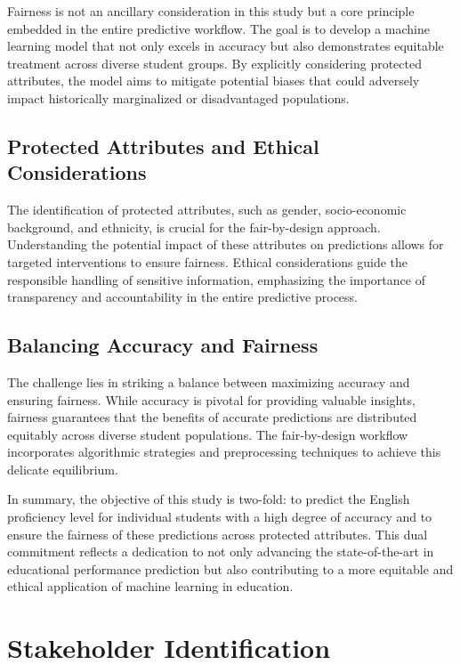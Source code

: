 \documentclass[12pt,a4paper,openright,twoside]{book}
\begin{document}
Fairness is not an ancillary consideration in this study but a core principle embedded in the entire predictive workflow. The goal is to develop a machine learning model that not only excels in accuracy but also demonstrates equitable treatment across diverse student groups. By explicitly considering protected attributes, the model aims to mitigate potential biases that could adversely impact historically marginalized or disadvantaged populations.

\subsection{Protected Attributes and Ethical Considerations}

The identification of protected attributes, such as gender, socio-economic background, and ethnicity, is crucial for the fair-by-design approach. Understanding the potential impact of these attributes on predictions allows for targeted interventions to ensure fairness. Ethical considerations guide the responsible handling of sensitive information, emphasizing the importance of transparency and accountability in the entire predictive process.

\subsection{Balancing Accuracy and Fairness}

The challenge lies in striking a balance between maximizing accuracy and ensuring fairness. While accuracy is pivotal for providing valuable insights, fairness guarantees that the benefits of accurate predictions are distributed equitably across diverse student populations. The fair-by-design workflow incorporates algorithmic strategies and preprocessing techniques to achieve this delicate equilibrium.

In summary, the objective of this study is two-fold: to predict the English proficiency level for individual students with a high degree of accuracy and to ensure the fairness of these predictions across protected attributes. This dual commitment reflects a dedication to not only advancing the state-of-the-art in educational performance prediction but also contributing to a more equitable and ethical application of machine learning in education.

\section{Stakeholder Identification}
\end{document}
